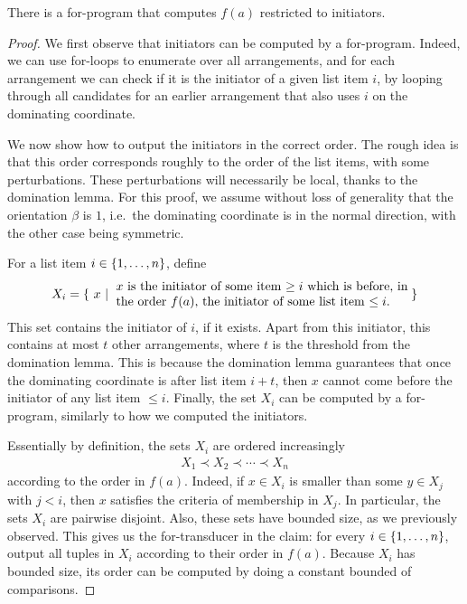 \begin{claim}
    There is a for-program that computes $f(a)$ restricted to initiators. 
\end{claim}
\begin{proof}
     We first observe that initiators can be computed by a for-program. Indeed, we can use for-loops to enumerate over all arrangements, and for each arrangement  we can check if it is the initiator of a given list item $i$, by looping through all candidates for an earlier arrangement that also uses $i$ on the dominating coordinate.
    
     We now show how to output the initiators in the correct order. The rough idea is that this order corresponds roughly to the order of the list items, with some perturbations. These perturbations will necessarily be local, thanks to the domination lemma. For this proof, we assume without loss of generality that the orientation $\beta$ is $1$, i.e.~the dominating coordinate is in the normal direction, with the other case being symmetric. 

     For a list item $i \in \{1,\ldots,n\}$, define 
    \begin{align*}
   X_i =  \setbuild{ x }{$x$ is the initiator of some item $\ge i$  which is before,  
    in \\ the order $f(a)$, the initiator of some list item $\le i$.}
    \end{align*}
    This set contains the initiator of $i$, if it exists. Apart from this initiator, this contains at most $t$ other arrangements, where $t$ is the threshold from the domination lemma. This is because the domination lemma guarantees that once the dominating coordinate is after list item $i+t$, then $x$ cannot come before the initiator of any list item $\le i$.  Finally, the set $X_i$ can be computed by a for-program, similarly to how we computed the initiators.

    Essentially by definition, the sets $X_i$ are ordered increasingly
    \begin{align*}
    X_1 \prec X_2 \prec \cdots \prec X_n
    \end{align*}
    according to the order in $f(a)$.
    Indeed, if $x \in X_i$ is smaller than some  $y \in X_j$ with $j < i$, then $x$ satisfies the criteria of membership in  $X_j$. In particular, the sets $X_i$ are pairwise disjoint. Also, these sets have bounded size, as we previously observed.  This gives us the for-transducer in the claim: for every $i \in \{1,\ldots,n\}$, output all tuples in $X_i$ according to their order in $f(a)$. Because $X_i$ has bounded size, its order can be computed by doing a constant bounded of comparisons.
\end{proof}


